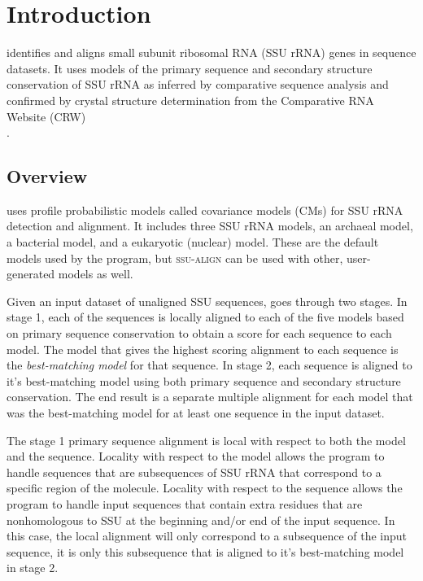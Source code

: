 \section{Introduction}

 identifies and aligns small subunit ribosomal RNA
(SSU rRNA) genes in sequence datasets. It uses models of the primary
sequence and secondary structure conservation of SSU rRNA as inferred
by comparative sequence analysis and confirmed by crystal structure
determination from the Comparative RNA Website (CRW) 
\\
\cite{CannoneGutell02}.

\subsection{Overview}
 uses profile probabilistic models called
covariance models (CMs) for SSU rRNA detection and alignment. It
includes three SSU rRNA models, an archaeal model, a bacterial model,
and a eukaryotic (nuclear) model.  These are the default models used
by the program, but \textsc{ssu-align} can be used with other,
user-generated models as well.

Given an input dataset of unaligned SSU sequences,
 goes through two stages. In stage 1, each of the
sequences is locally aligned to each of the five models based on
primary sequence conservation to obtain a score for each sequence to
each model.  The model that gives the highest scoring alignment to
each sequence is the \emph{best-matching model} for that sequence.  In
stage 2, each sequence is aligned to it's best-matching model using
both primary sequence and secondary structure conservation. The end
result is a separate multiple alignment for each model that was the
best-matching model for at least one sequence in the input dataset.

The stage 1 primary sequence alignment is local with respect to both
the model and the sequence. Locality with respect to the model allows
the program to handle sequences that are subsequences of SSU
rRNA that correspond to a specific region of the molecule. Locality
with respect to the sequence allows the program to handle input
sequences that contain extra residues that are nonhomologous to SSU at
the beginning and/or end of the input sequence. In this case, the
local alignment will only correspond to a subsequence of the input
sequence, it is only this subsequence that is aligned to it's
best-matching model in stage 2.

